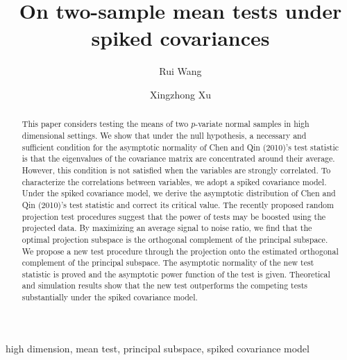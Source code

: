\documentclass[times,sort&compress,3p]{elsarticle}
\theoremstyle{plain}
\theoremstyle{definition}
\theoremstyle{remark}
\begin{document}
\begin{frontmatter}

\title{On two-sample mean tests under spiked covariances}

    \author[mymainaddress]{Rui Wang}
    \author[mymainaddress,mysecondaryaddress]{Xingzhong Xu}
    \address[mymainaddress]{School of Mathematics and Statistics, Beijing Institute of Technology, Beijing 
    100081,China}
    \address[mysecondaryaddress]{Beijing Key Laboratory on MCAACI, Beijing Institute of Technology, Beijing 100081,China}




\begin{abstract}
    This paper considers testing the means of two $p$-variate normal samples in high dimensional settings.
    We show that under the null hypothesis, a necessary and sufficient condition for the asymptotic normality of Chen and Qin (2010)'s test statistic is that the eigenvalues of the covariance matrix are concentrated around their average. However, this condition is not satisfied when the variables are strongly correlated.
    To characterize the correlations between variables, we adopt a spiked covariance model. 
    Under the spiked covariance model, we derive the asymptotic distribution of Chen and Qin (2010)'s test statistic and correct its critical value.
    The recently proposed random projection test procedures suggest that the power of tests may be boosted using the projected data.
    By maximizing an average signal to noise ratio, we find that the optimal projection subspace is the orthogonal complement of the principal subspace. 
    We propose a new test procedure through the projection onto the estimated orthogonal complement of the principal subspace.
    The asymptotic normality of the new test statistic is proved and the asymptotic power function of the test is given.
    Theoretical and simulation results show that the new test outperforms the competing tests substantially under the spiked covariance model.
\end{abstract}

\begin{keyword}
    high dimension, mean test, principal subspace, spiked covariance model
\end{keyword}

\end{frontmatter}
\end{document}
